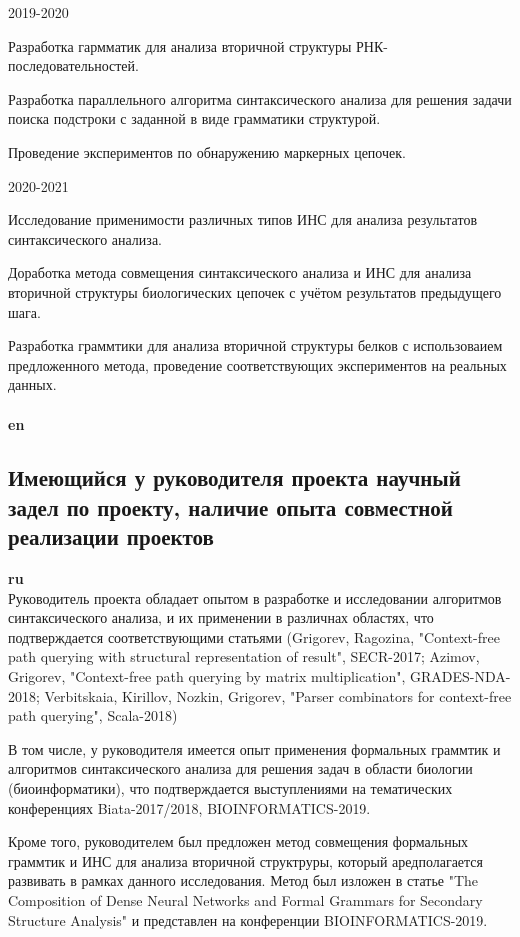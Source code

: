 ﻿\documentclass[12pt]{article}  %
\theoremstyle{remark}
\begin{document}
2019-2020

Разработка гармматик для анализа вторичной структуры РНК-последовательностей.

Разработка параллельного алгоритма синтаксического анализа для решения задачи поиска подстроки с заданной в виде грамматики структурой.

Проведение экспериментов по обнаружению маркерных цепочек.

2020-2021

Исследование применимости различных типов ИНС для анализа результатов синтаксического анализа.

Доработка метода совмещения синтаксического анализа и ИНС для анализа вторичной структуры биологических цепочек с учётом результатов предыдущего шага.

Разработка граммтики для анализа вторичной структуры белков с использоваием предложенного метода, проведение соответствующих экспериментов на реальных данных.
\\
\\
\textbf{en}\\


\subsection{Имеющийся у руководителя проекта научный задел по проекту, наличие опыта совместной реализации проектов}

\textbf{ru}\\
Руководитель проекта обладает опытом в разработке и исследовании алгоритмов синтаксического анализа, и их применении в различнах областях, что подтверждается соответствующими статьями (Grigorev, Ragozina, "Context-free path querying with structural representation of result", SECR-2017; Azimov, Grigorev, "Context-free path querying by matrix multiplication", GRADES-NDA-2018; Verbitskaia, Kirillov, Nozkin, Grigorev, "Parser combinators for context-free path querying", Scala-2018)

В том числе, у руководителя имеется опыт применения формальных граммтик и алгоритмов синтаксического анализа для решения задач в области биологии (биоинформатики), что подтверждается выступлениями на тематических конференциях Biata-2017/2018, BIOINFORMATICS-2019.

Кроме того, руководителем был предложен метод совмещения формальных граммтик и ИНС для анализа вторичной структруры, который аредполагается развивать в рамках данного исследования. Метод был изложен в статье "The Composition of Dense Neural Networks and Formal Grammars for Secondary Structure Analysis" и представлен на конференции BIOINFORMATICS-2019.
\end{document}
